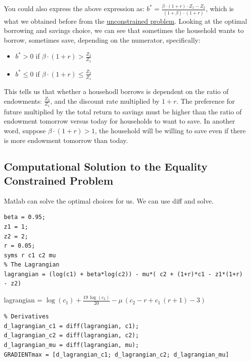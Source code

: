 \documentclass[
]{book}
\begin{document}
You could also express the above expression as:
\(b^{\ast } =\frac{\beta \cdot (1+r)\cdot Z_1 -Z_2 }{\left(1+\beta \right)\cdot \left(1+r\right)}\),
which is what we obtained before from the \href{https://fanwangecon.github.io/Math4Econ/derivative_application/K_save_households.html}{unconstrained
problem}.
Looking at the optimal borrowing and savings choice, we can see that
sometimes the household wants to borrow, sometimes save, depending on
the numerator, specifically:

\begin{itemize}
\item
  \(b^{\ast } >0\) if \(\beta \cdot (1+r)>\frac{Z_2 }{Z_1 }\)
\item
  \(b^{\ast } \le 0\) if \(\beta \cdot (1+r)\le \frac{Z_2 }{Z_1 }\)
\end{itemize}

This tells us that whether a househodl borrows is dependent on the ratio
of endowments: \(\frac{Z_2 }{Z_1 }\), and the discount rate multiplied by
\(1+r\). The preference for future multiplied by the total return to
savings must be higher than the ratio of endowment tomorrow versus today
for households to want to save. In another word, suppose
\(\beta \cdot (1+r)>1\), the household will be willing to save even if
there is more endowment tomorrow than today.

\hypertarget{computational-solution-to-the-equality-constrained-problem}{%
\subsection{Computational Solution to the Equality Constrained Problem}\label{computational-solution-to-the-equality-constrained-problem}}

Matlab can solve the optimal choices for us. We can use diff and solve.

\begin{verbatim}
beta = 0.95;
z1 = 1;
z2 = 2;
r = 0.05;
syms r c1 c2 mu
% The Lagrangian
lagrangian = (log(c1) + beta*log(c2)) - mu*( c2 + (1+r)*c1 - z1*(1+r) - z2)
\end{verbatim}

lagrangian =
\(\displaystyle \log \left(c_1 \right)+\frac{19\,\log \left(c_2 \right)}{20}-\mu \,{\left(c_2 -r+c_1 \,{\left(r+1\right)}-3\right)}\)

\begin{verbatim}
% Derivatives
d_lagrangian_c1 = diff(lagrangian, c1);
d_lagrangian_c2 = diff(lagrangian, c2);
d_lagrangian_mu = diff(lagrangian, mu);
GRADIENTmax = [d_lagrangian_c1; d_lagrangian_c2; d_lagrangian_mu]
\end{verbatim}
\end{document}
